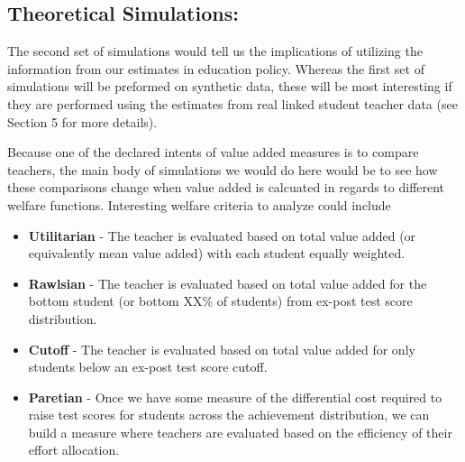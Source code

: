 \documentclass[letterpaper,12pt]{article}
\begin{document}




%


\subsection{Theoretical Simulations:}

The second set of simulations would tell us the implications of utilizing the information from our estimates in education policy. Whereas the first set of simulations will be preformed on synthetic data, these will be most interesting if they are performed using the estimates from real linked student teacher data (see Section 5 for more details).

Because one of the declared intents of value added measures is to compare teachers, the main body of simulations we would do here would be to see how these comparisons change when value added is calcuated in regards to different welfare functions. Interesting welfare criteria to analyze could include

\begin{itemize}
    \item \textbf{Utilitarian} - The teacher is evaluated based on total value added (or equivalently mean value added) with each student equally weighted.
    \item \textbf{Rawlsian} - The teacher is evaluated based on total value added for the bottom student (or bottom XX\% of students) from ex-post test score distribution. 
    \item \textbf{Cutoff} - The teacher is evaluated based on total value added for only students below an ex-post test score cutoff.
    \item \textbf{Paretian} - Once we have some measure of the differential cost required to raise test scores for students across the achievement distribution, we can build a measure where teachers are evaluated based on the efficiency of their effort allocation.
\end{itemize}
\end{document}
